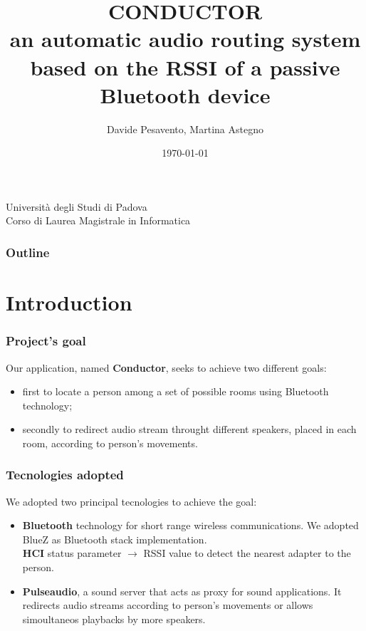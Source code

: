 \documentclass{beamer}
\title{\textbf{CONDUCTOR} \\ an automatic audio routing system based on the RSSI of a passive Bluetooth device}
\author{Davide Pesavento, Martina Astegno}
\date{\today}
\begin{document}
\begin{frame}[plain]
\titlepage
	\begin{center}
		Universit\`{a} degli Studi di Padova \\
		Corso di Laurea Magistrale in Informatica
	\end{center}
\end{frame} 
 
\begin{frame}
	\frametitle{Outline}
	\tableofcontents 
\end{frame}


\section{Introduction}

	\begin{frame}
		\frametitle{Project's goal}
		Our application, named \textbf{Conductor}, seeks to achieve two different goals: 
		\pause
		\begin{itemize}
		\item first to locate a person among a set of possible rooms using Bluetooth technology;
		\pause
		\item secondly to redirect audio stream throught different speakers, placed in each room, according to person's movements. 
		\end{itemize}    
	\end{frame}
	
	\begin{frame}
		\frametitle{Tecnologies adopted}
		We adopted two principal tecnologies to achieve the goal:
		\pause
		\begin{itemize}
		\item \textbf{Bluetooth} technology for short range wireless communications. We adopted BlueZ as Bluetooth stack implementation.\\ \textbf{HCI} status parameter $\rightarrow$ RSSI value to detect the nearest adapter to the person. 
		\pause
		\item \textbf{Pulseaudio}, a sound server that acts as proxy for sound applications. It redirects audio streams according to person's movements or allows simoultaneos playbacks by more speakers. 
		
		\end{itemize}
	\end{frame}
	
	
\end{document}
